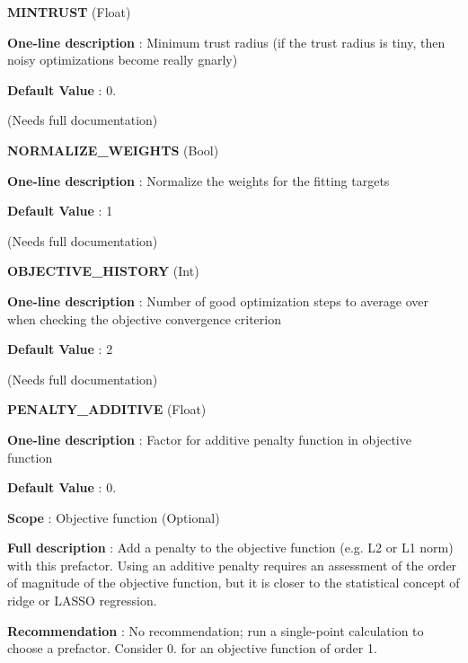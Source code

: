 \begin{DoxyItemize}
\item {\bfseries  M\-I\-N\-T\-R\-U\-S\-T } (Float) \par
{\bfseries  One-\/line description }\-: Minimum trust radius (if the trust radius is tiny, then noisy optimizations become really gnarly) \par
{\bfseries  Default Value }\-: 0. \par
(Needs full documentation)\end{DoxyItemize}
\begin{DoxyItemize}
\item {\bfseries  N\-O\-R\-M\-A\-L\-I\-Z\-E\-\_\-\-W\-E\-I\-G\-H\-T\-S } (Bool) \par
{\bfseries  One-\/line description }\-: Normalize the weights for the fitting targets \par
{\bfseries  Default Value }\-: 1 \par
(Needs full documentation)\end{DoxyItemize}
\begin{DoxyItemize}
\item {\bfseries  O\-B\-J\-E\-C\-T\-I\-V\-E\-\_\-\-H\-I\-S\-T\-O\-R\-Y } (Int) \par
{\bfseries  One-\/line description }\-: Number of good optimization steps to average over when checking the objective convergence criterion \par
{\bfseries  Default Value }\-: 2 \par
(Needs full documentation)\end{DoxyItemize}
\begin{DoxyItemize}
\item {\bfseries  P\-E\-N\-A\-L\-T\-Y\-\_\-\-A\-D\-D\-I\-T\-I\-V\-E } (Float) \par
{\bfseries  One-\/line description }\-: Factor for additive penalty function in objective function \par
{\bfseries  Default Value }\-: 0. \par
{\bfseries  Scope }\-: Objective function (Optional) \par
{\bfseries  Full description }\-: Add a penalty to the objective function (e.\-g. L2 or L1 norm) with this prefactor. Using an additive penalty requires an assessment of the order of magnitude of the objective function, but it is closer to the statistical concept of ridge or L\-A\-S\-S\-O regression. \par
{\bfseries  Recommendation }\-: No recommendation; run a single-\/point calculation to choose a prefactor. Consider 0. for an objective function of order 1.\end{DoxyItemize}
